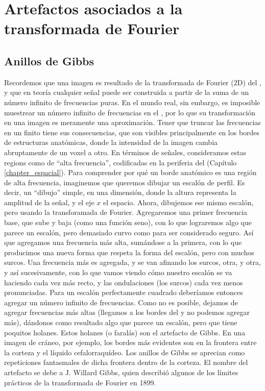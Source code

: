 \section{Artefactos asociados a la transformada de Fourier}
\subsection{Anillos de Gibbs}
Recordemos que una imagen es resultado de la transformada de Fourier (2D) del \espaciok, y que en teoría cualquier señal puede ser construida a partir de la suma de un número infinito de frecuencias puras. En el mundo real, sin embargo, es imposible muestrear un número infinito de frecuencias en el \espaciok, por lo que su transformación en una imagen  es meramente una aproximación. Tener que truncar las frecuencias en un \espaciok finito tiene sus consecuencias, que son visibles principalmente en los bordes de estructuras anatómicas, donde la intensidad de la imagen cambia abruptamente de un voxel a otro. En términos de señales, consideramos estas regions como de ``alta frecuencia'', codificadas en la periferia del \espaciok (Capítulo \ref{chapter_espacial}). Para comprender por qué un borde anatómico es una región de alta frecuencia, imaginemos que queremos dibujar un escalón de perfil. Es decir, un ``dibujo'' simple, en una dimensión, donde la altura representa la amplitud de la señal, y el eje $x$ el espacio. Ahora, dibujemos ese mismo escalón, pero usando la transforamada de Fourier. Agregaremos una primer frecuencia base, que sube y baja (como una función seno), con lo que lograremos algo que parece un escalón, pero demasiado curvo como para ser considerado seguro. Así que agregamos una frecuencia más alta, sumándose a la primera, con lo que producimos una nueva forma que respeta la forma del escalón, pero con muchos surcos. Una frecuencia más es agregada, y se van afinando los surcos, otra, y otra, y así sucesivamente, con lo que vamos viendo cómo nuestro escalón se va haciendo cada vez más recto, y las ondulaciones (los surcos) cada vez menos pronunciadas. Para un escalón perfectamente cuadrado deberíamos entonces agregar un número infinito de frecuencias. Como no es posible, dejamos de agregar frecuencias más altas (llegamos a los bordes del \espaciok y no podemos agregar más), dándonos como resultado algo que parece un escalón, pero que tiene poquitos holanes. Estos holanes (o faralás) son el artefacto de Gibbs. En una imagen de cráneo, por ejemplo, los bordes más evidentes son en la frontera entre la corteza y el líquido cefalorraquídeo. Los anillos de Gibbs se aprecian como repeticiones fantasmales de dicha frontera dentro de la corteza. El nombre del artefacto se debe a J. Willard Gibbs, quien describió algunos de los límites prácticos de la transformada de Fourier en 1899.

